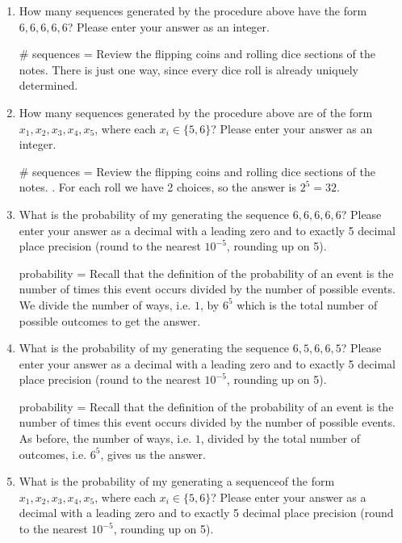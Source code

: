 \documentclass[11pt,preview]{standalone} %
\begin{document}
\begin{enumerate}
\begin{enumerate}
\item How many sequences generated by the procedure above have the form $6,6,6,6,6$? Please enter your answer as an integer. 
\begin{Freeform}{1}
\# sequences = 
\Hint Review the flipping coins and rolling dice sections of the notes.
\Solution There is just one way, since every dice roll is already uniquely determined.
\end{Freeform}
\item How many sequences generated by the procedure above are of the form $x_1, x_2, x_3, x_4, x_5$, where each $x_i \in \{5,6\}$? Please enter your answer as an integer. 
\begin{Freeform}{32}
\# sequences = 
\Hint Review the flipping coins and rolling dice sections of the notes.
. For each roll we have 2 choices, so the answer is $2^5=32$.
\end{Freeform}
\item What is the probability of my generating the sequence $6,6,6,6,6$? Please enter your answer as a decimal with a leading zero and to exactly 5 decimal place precision  (round to the nearest $10^{-5}$, rounding up on 5).
\begin{Freeform}{0.00013}
probability = 
\Hint Recall that the definition of the probability of an event is the number of times this event occurs divided by the number of possible events. 
\Solution We divide the number of ways, i.e. $1$, by $6^5$ which is the total number of possible outcomes to get the answer.
\end{Freeform}
\item What is the probability of my generating the sequence $6, 5, 6, 6, 5$? Please enter your answer as a decimal with a leading zero and to exactly 5 decimal place precision  (round to the nearest $10^{-5}$, rounding up on 5).
\begin{Freeform}{0.00013}
probability = 
\Hint Recall that the definition of the probability of an event is the number of times this event occurs divided by the number of possible events.
\Solution As before, the number of ways, i.e. $1$, divided by the total number of outcomes, i.e. $6^5$, gives us the answer. 
\end{Freeform}
\item What is the probability of my generating a sequenceof the form $x_1, x_2, x_3, x_4, x_5$, where each $x_i \in \{5,6\}$? Please enter your answer as a decimal with a leading zero and to exactly 5 decimal place precision (round to the nearest $10^{-5}$, rounding up on 5).

\end{enumerate}
\end{enumerate}
\end{document}
